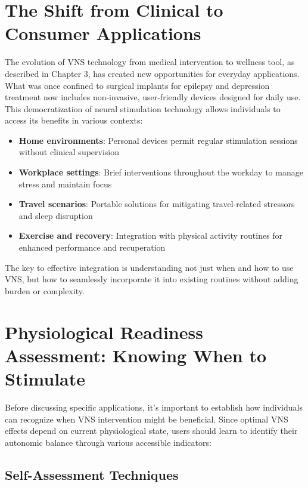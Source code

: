 \documentclass[
  Letterpaper,
]{scrbook}
\providecommand{\tightlist}{%
  \setlength{\itemsep}{0pt}\setlength{\parskip}{0pt}}\usepackage{longtable,booktabs,array}
\begin{document}
\section{The Shift from Clinical to Consumer
Applications}\label{the-shift-from-clinical-to-consumer-applications}

The evolution of VNS technology from medical intervention to wellness
tool, as described in Chapter 3, has created new opportunities for
everyday applications. What was once confined to surgical implants for
epilepsy and depression treatment now includes non-invasive,
user-friendly devices designed for daily use. This democratization of
neural stimulation technology allows individuals to access its benefits
in various contexts:

\begin{itemize}
\tightlist
\item
  \textbf{Home environments}: Personal devices permit regular
  stimulation sessions without clinical supervision
\item
  \textbf{Workplace settings}: Brief interventions throughout the
  workday to manage stress and maintain focus
\item
  \textbf{Travel scenarios}: Portable solutions for mitigating
  travel-related stressors and sleep disruption
\item
  \textbf{Exercise and recovery}: Integration with physical activity
  routines for enhanced performance and recuperation
\end{itemize}

The key to effective integration is understanding not just when and how
to use VNS, but how to seamlessly incorporate it into existing routines
without adding burden or complexity.

\section{Physiological Readiness Assessment: Knowing When to
Stimulate}\label{physiological-readiness-assessment-knowing-when-to-stimulate}

Before discussing specific applications, it's important to establish how
individuals can recognize when VNS intervention might be beneficial.
Since optimal VNS effects depend on current physiological state, users
should learn to identify their autonomic balance through various
accessible indicators:

\subsection{Self-Assessment
Techniques}\label{self-assessment-techniques}
\end{document}
